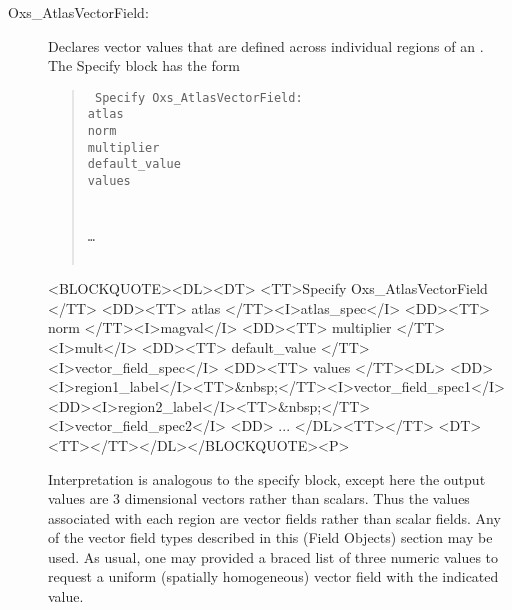 \begin{description}
\item[Oxs\_AtlasVectorField:\label{item:AtlasVectorField}]
%
   Declares vector values that are defined across individual regions of
   an .  The Specify block has the form
      \begin{latexonly}
      \begin{quote}\tt
      Specify Oxs\_AtlasVectorField: \ocb\\
       \bi atlas \\
       \bi norm \\
       \bi multiplier \\
       \bi default\_value \\
       \bi values \ocb\\
       \bi\bi{}\\
       \bi\bi{}\\
       \bi\bi \ldots\\
       \bi\ccb\\
      \ccb
      \end{quote}
      \end{latexonly}
      \begin{rawhtml}
      <BLOCKQUOTE><DL><DT>
      <TT>Specify Oxs_AtlasVectorField {</TT>
      <DD><TT> atlas </TT><I>atlas_spec</I>
      <DD><TT> norm </TT><I>magval</I>
      <DD><TT> multiplier </TT><I>mult</I>
      <DD><TT> default_value </TT><I>vector_field_spec</I>
      <DD><TT> values {</TT><DL>
          <DD><I>region1_label</I><TT>&nbsp;</TT><I>vector_field_spec1</I>
          <DD><I>region2_label</I><TT>&nbsp;</TT><I>vector_field_spec2</I>
          <DD> ...
      </DL><TT>}</TT>
      <DT><TT>}</TT></DL></BLOCKQUOTE><P>
      \end{rawhtml}
   Interpretation is analogous to the
   specify block, except here the output values are 3 dimensional
   vectors rather than scalars.  Thus the values associated with each
   region are vector fields rather than scalar fields.  Any of the
   vector field types described in this (Field Objects) section may be
   used.  As usual, one may provided a braced list of three numeric
   values to request a uniform (spatially homogeneous) vector field with
   the indicated value.


\end{description}
